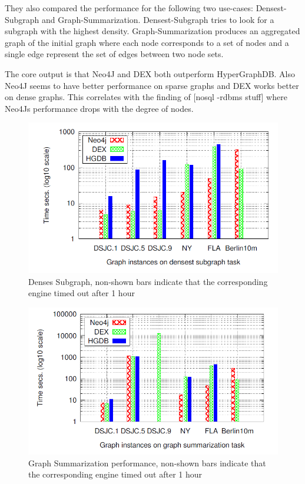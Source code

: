 \documentclass{acm_proc_article-sp}
\begin{document}
They also compared the performance for the following two use-cases: Densest-Subgraph and Graph-Summarization. Densest-Subgraph tries to look for a subgraph with the highest density. Graph-Summarization produces an aggregated graph of the initial graph where each node corresponds to a set of nodes and a single edge represent the set of edges between two node sets.

The core output is that Neo4J and DEX both outperform HyperGraphDB. Also Neo4J seems to have better performance on sparse graphs and DEX works better on dense graphs. This correlates with the finding of [nosql -rdbms stuff] where Neo4Js performance drops with the degree of nodes.

\begin{figure}[hbtp]
	\centering
	\includegraphics[scale=0.35]{dense.png}
	\caption{Denses Subgraph, non-shown bars indicate that
		the corresponding engine timed out after 1 hour}
\end{figure}

\begin{figure}[hbtp]
	\centering
	\includegraphics[scale=0.35]{summarization.png}
	\caption{Graph Summarization performance, non-shown bars indicate that
		the corresponding engine timed out after 1 hour}
\end{figure}
\end{document}
